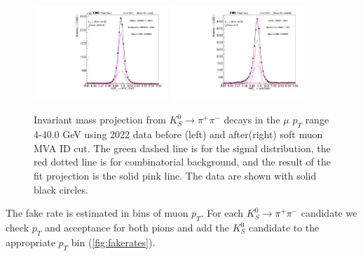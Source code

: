 \begin{figure}[!htb]
  \begin{center}
    \includegraphics[width=0.45\textwidth]{figures/chapter4/fakerate/Combined_data_combined_522_2022_ks_trigger_lxy_hv0_Mass_allbin_bla.pdf}
    \includegraphics[width=0.45\textwidth]{figures/chapter4/fakerate/Combined_data_combined_522_2022_ks_trigger_lxy_hv0_Mass_muid_20_allbin_bla.pdf}\\
  \end{center}
  \caption{Invariant mass projection from $K_S^0 \to \pi^+ \pi^-$ decays in the $\mu$
    $p_{T}$ range 4-40.0 GeV using 2022 data before (left) and after(right) soft muon MVA ID cut.
    The green dashed line is for the signal distribution, the red
    dotted line is for combinatorial background, and the result of the
    fit projection is the solid pink line. The data are shown with
    solid black circles.}
  \label{fig:fit_example_pion}
\end{figure}

The fake rate is estimated in bins of muon $p_{T}$. For each $K_S^0 \to \pi^+ \pi^-$ candidate we check $p_{T}$ and acceptance for both pions and add the $K_S^0$ candidate to the appropriate $p_{T}$ bin (\ref{fig:fakerates}).

